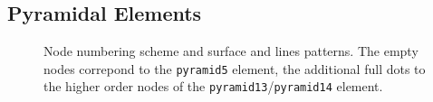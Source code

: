 \subsection{Pyramidal Elements}

\begin{figure}[h!]
\begin{center}
\caption{Node numbering scheme and surface and lines patterns. The empty nodes correpond to the \texttt{pyramid5} element, the additional full dots to the higher order nodes of the \texttt{pyramid13}/\texttt{pyramid14} element.}
\label{fig:conventions:pyramid}
\end{center}
\end{figure}



